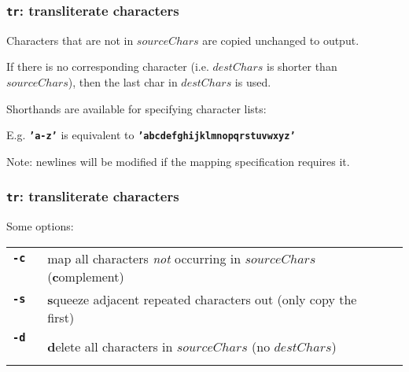 \begin{frame}
\frametitle{\textbf{\tt{tr}}: transliterate characters}
Characters that are not in $sourceChars$ are copied unchanged to output.

If there is no corresponding character (i.e. $destChars$ is shorter than $sourceChars$), then the last char in $destChars$ is used.

Shorthands are available for specifying character lists:

E.g. \textbf{\tt{'a-z'}} is equivalent to \textbf{\tt{'abcdefghijklmnopqrstuvwxyz'}}

Note: newlines will be modified if the mapping specification requires it.
\end{frame}

\begin{frame}
\frametitle{\textbf{\tt{tr}}: transliterate characters}
Some options:


\begin{center}
\begin{tabular}{lll}

  \begin{minipage}{1cm}{\bf{\textbf{\tt{-c}}}} ~\end{minipage}
   & \begin{minipage}{18cm}map all characters {\em{not}} occurring in $sourceChars$ {\small ({\bf{c}}omplement)}~\end{minipage}
\\[1ex]

  \begin{minipage}{1cm}{\bf{\textbf{\tt{-s}}}} ~\end{minipage}
   & \begin{minipage}{18cm}{\bf{s}}queeze adjacent repeated characters out (only copy the first)~\end{minipage}
\\[1ex]

  \begin{minipage}{1cm}{\bf{\textbf{\tt{-d}}}} ~\end{minipage}
   & \begin{minipage}{18cm}{\bf{d}}elete all characters in $sourceChars$ (no $destChars$)~\end{minipage}
\\[1ex]
\end{tabular}
\end{center}

\end{frame}

